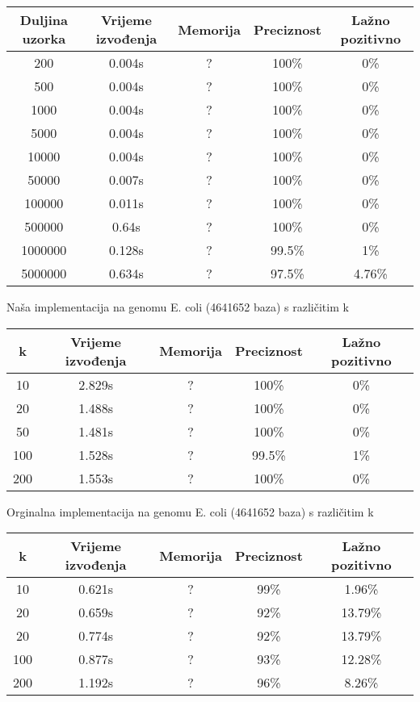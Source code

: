\documentclass[seminarskirad]{fer}
\begin{document}
\begin{center}
\begin{tabular}{||c c c c c||} 
 \hline
 Duljina uzorka & Vrijeme izvođenja & Memorija & Preciznost & Lažno pozitivno \\ [0.5ex] 
 \hline\hline
 200 & 0.004s & ? & 100\% & 0\% \\ 
 \hline
 500 & 0.004s & ? & 100\% & 0\% \\
 \hline
 1000 & 0.004s & ? & 100\% & 0\% \\
 \hline
 5000 & 0.004s & ? & 100\% & 0\% \\
 \hline
 10000 & 0.004s & ? & 100\% & 0\% \\
 \hline
 50000 & 0.007s & ? & 100\% & 0\% \\ 
 \hline
 100000 & 0.011s & ? & 100\% & 0\% \\
 \hline
 500000 & 0.64s & ? & 100\% & 0\% \\
 \hline
 1000000 & 0.128s & ? & 99.5\% & 1\% \\
 \hline
 5000000 & 0.634s & ? & 97.5\% & 4.76\% \\ [1ex] 
 \hline
\end{tabular}
\end{center}

Naša implementacija na genomu E. coli (4641652 baza) s različitim k

\begin{center}
\begin{tabular}{||c c c c c||} 
 \hline
 k & Vrijeme izvođenja & Memorija & Preciznost & Lažno pozitivno \\ [0.5ex] 
 \hline\hline
 10 & 2.829s & ? & 100\% & 0\% \\ 
 \hline
 20 & 1.488s & ? & 100\% & 0\% \\
 \hline
 50 & 1.481s & ? & 100\% & 0\% \\
 \hline
 100 & 1.528s & ? & 99.5\% & 1\% \\
 \hline
 200 & 1.553s & ? & 100\% & 0\% \\ [1ex] 
 \hline
\end{tabular}
\end{center}

Orginalna implementacija na genomu E. coli (4641652 baza) s različitim k

\begin{center}
\begin{tabular}{||c c c c c||} 
 \hline
 k & Vrijeme izvođenja & Memorija & Preciznost & Lažno pozitivno \\ [0.5ex] 
 \hline\hline
 10 & 0.621s & ? & 99\% & 1.96\% \\ 
 \hline
 20 & 0.659s & ? & 92\% & 13.79\% \\
 \hline
 20 & 0.774s & ? & 92\% & 13.79\% \\
 \hline
 100 & 0.877s & ? & 93\% & 12.28\% \\
 \hline
 200 & 1.192s & ? & 96\% & 8.26\% \\ [1ex] 
 \hline
\end{tabular}
\end{center}
\end{document}
